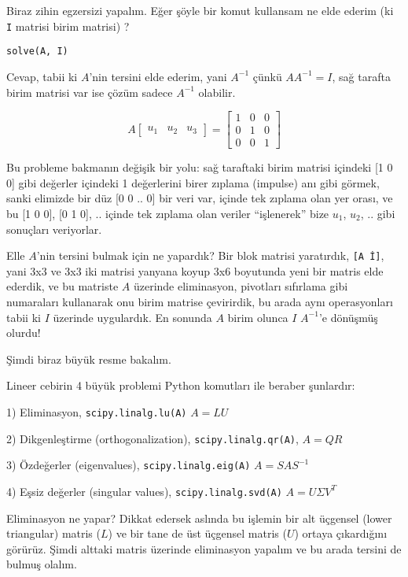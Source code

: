 \documentclass[12pt,fleqn]{article}\usepackage{../../common}
\begin{document}
Biraz zihin egzersizi yapalım. Eğer şöyle bir komut kullansam ne elde
ederim (ki \verb!I! matrisi birim matrisi) ?

\begin{verbatim}
solve(A, I)
\end{verbatim}

Cevap, tabii ki $A$'nin tersini elde ederim, yani $A^{-1}$ çünkü $AA^{-1} =I$,
sağ tarafta birim matrisi var ise çözüm sadece $A^{-1}$ olabilir.

$$ 
A 
\left[\begin{array}{rrr}
u_1 & u_2 & u_3
\end{array}\right]
=
\left[\begin{array}{rrr}
1 & 0 & 0\\
0 & 1 & 0\\
0 & 0 & 1
\end{array}\right]
 $$

Bu probleme bakmanın değişik bir yolu: sağ taraftaki birim matrisi içindeki
[1 0 0] gibi değerler içindeki 1 değerlerini birer zıplama (impulse) anı
gibi görmek, sanki elimizde bir düz [0 0 .. 0] bir veri var, içinde tek
zıplama olan yer orası, ve bu [1 0 0], [0 1 0], .. içinde tek zıplama olan
veriler ``işlenerek'' bize $u_1$, $u_2$, .. gibi sonuçları veriyorlar. 

Elle $A$'nin tersini bulmak için ne yapardık? Bir blok matrisi yaratırdık,
\verb![A İ]!, yani 3x3 ve 3x3 iki matrisi yanyana koyup 3x6 boyutunda yeni
bir matris elde ederdik, ve bu matriste $A$ üzerinde eliminasyon, pivotları
sıfırlama gibi numaraları kullanarak onu birim matrise çevirirdik, bu arada
aynı operasyonları tabii ki $I$ üzerinde uygulardık. En sonunda $A$ birim
olunca $I$ $A^{-1}$'e dönüşmüş olurdu!

Şimdi biraz büyük resme bakalım. 

Lineer cebirin 4 büyük problemi Python komutları ile beraber şunlardır:

1) Eliminasyon, 
\verb!scipy.linalg.lu(A)! $A = LU$

2) Dikgenleştirme (orthogonalization), 
\verb!scipy.linalg.qr(A)!, $A = QR$

3) Özdeğerler (eigenvalues), 
\verb!scipy.linalg.eig(A)! $A = SAS^{-1}$

4) Eşsiz değerler (singular values), 
\verb!scipy.linalg.svd(A)! $A = U \Sigma V^{T}$

Eliminasyon ne yapar? Dikkat edersek aslında bu işlemin bir alt üçgensel
(lower triangular) matris ($L$) ve bir tane de üst üçgensel matris ($U$)
ortaya çıkardığını görürüz. Şimdi alttaki matris üzerinde eliminasyon
yapalım ve bu arada tersini de bulmuş olalım. 
\end{document}
